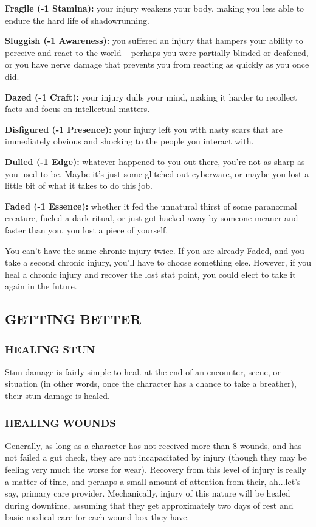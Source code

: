 \documentclass[oneside,10pt]{article}
\begin{document}
\begin{multicols}{2}
\begin{adjustwidth*}{.5cm}{.5cm}
\textbf{Fragile (-1 Stamina):} your injury weakens your body, making you less able to endure the hard life of
shadowrunning.

\textbf{Sluggish (-1 Awareness):} you suffered an
injury that hampers your ability to perceive and
react to the world -- perhaps you were partially blinded or deafened, or you have
nerve damage that prevents you from reacting as quickly
as you once did.

\textbf{Dazed (-1 Craft):} your injury dulls your mind, making it
harder to recollect facts and focus on
intellectual matters.

\textbf{Disfigured (-1 Presence):} your injury left you with nasty
scars that are immediately obvious and shocking to the
people you interact with.

\textbf{Dulled (-1 Edge):} whatever happened to you out there,
you’re not as sharp as you used to be. Maybe it’s just some
glitched out cyberware, or maybe you lost a little bit of
what it takes to do this job.

\textbf{Faded (-1 Essence):} whether it fed the unnatural thirst of
some paranormal creature, fueled a dark ritual, or just got
hacked away by someone meaner and faster than you, you
lost a piece of yourself.
\end{adjustwidth*}

You can’t have the same chronic injury twice. If you are already Faded, and you take a second chronic injury, you’ll have
to choose something else. However, if you heal a chronic injury and recover the lost stat point, you could elect to take it
again in the future.


\subsection{GETTING BETTER}
\subsubsection{HEALING STUN}
Stun damage is fairly simple to heal. at the end of an encounter, scene, or situation (in other words, once the character
has a chance to take a breather), their stun damage is healed.

\subsubsection{HEALING WOUNDS}
Generally, as long as a character has not received more than
8 wounds, and has not failed a gut check, they are not incapacitated by injury (though they may be feeling very much
the worse for wear). Recovery from this level of injury is really
a matter of time, and perhaps a small amount of attention
from their, ah...let’s say, primary care provider. Mechanically,
injury of this nature will be healed during downtime, assuming that they get approximately two days of rest and basic
medical care for each wound box they have.


\end{multicols}
\end{document}
